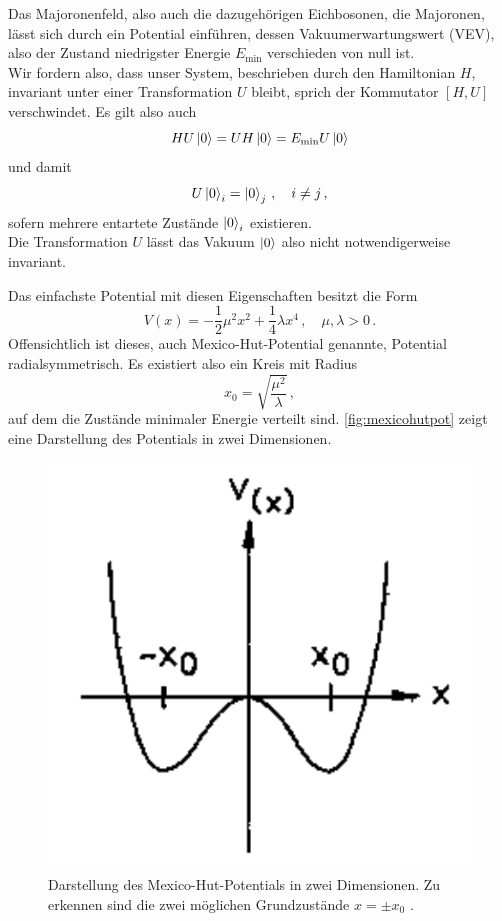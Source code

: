 Das Majoronenfeld, also auch die dazugehörigen Eichbosonen, die Majoronen, lässt sich durch ein Potential einführen, dessen Vakuumerwartungswert (VEV), also der Zustand niedrigster Energie $E_\text{min}$ verschieden von null ist. \\
Wir fordern also, dass unser System, beschrieben durch den Hamiltonian $H$, invariant unter einer Transformation $U$ bleibt, sprich der Kommutator $[H, U]$ verschwindet.
Es gilt also auch
\begin{equation*}
    H U \ket{0} = U H \ket{0} = E_\text{min} U  \ket{0} 
\end{equation*}
und damit
\begin{equation*}
    U \ket{0}_i = \ket{0}_j \,, \quad i \neq j \,,
\end{equation*}
sofern mehrere entartete Zustände $\ket{0}_i$ existieren. \\
Die Transformation $U$ lässt das Vakuum $\ket{0}$ also nicht notwendigerweise invariant.

Das einfachste Potential mit diesen Eigenschaften besitzt die Form
\begin{equation}
    V(x) = -\frac{1}{2} \mu^2 x^2 + \frac{1}{4} \lambda x^4 \,, \quad \mu,\lambda > 0 \,.
\end{equation}
Offensichtlich ist dieses, auch Mexico-Hut-Potential genannte, Potential radialsymmetrisch.
Es existiert also ein Kreis mit Radius
\begin{equation*}
    x_0 = \sqrt{\frac{\mu^2}{\lambda}} \,,
\end{equation*}
auf dem die Zustände minimaler Energie verteilt sind.
\autoref{fig:mexicohutpot} zeigt eine Darstellung des Potentials in zwei Dimensionen.

\begin{figure}[H]
    \centering
    \includegraphics[]{figures/MexicoHutpotential.pdf}
    \caption{Darstellung des Mexico-Hut-Potentials in zwei Dimensionen. Zu erkennen sind die zwei möglichen Grundzustände $x = \pm x_0$ \cite{kleingrot}.}
    \label{fig:mexicohutpot}
\end{figure}

